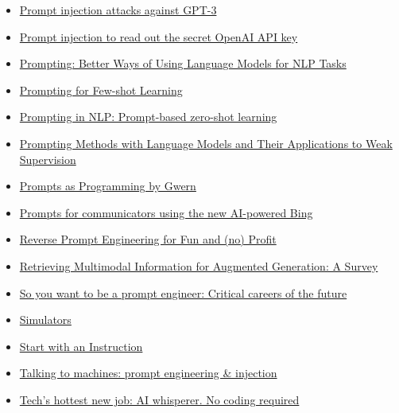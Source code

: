 \begin{itemize}
  \item \href{https://simonwillison.net/2022/Sep/12/prompt-injection}{Prompt injection attacks against GPT-3}
  \item \href{https://twitter.com/ludwig_stumpp/status/1619701277419794435?s=20&t=GtoMlmYCSt-UmvjqJVbBSA}{Prompt injection to read out the secret OpenAI API key}
  \item \href{https://thegradient.pub/prompting/}{Prompting: Better Ways of Using Language Models for NLP Tasks}
  \item \href{https://www.cs.princeton.edu/courses/archive/fall22/cos597G/lectures/lec05.pdf}{Prompting for Few-shot Learning}
  \item \href{https://savasy-22028.medium.com/prompting-in-nlp-prompt-based-zero-shot-learning-3f34bfdb2b72}{Prompting in NLP: Prompt-based zero-shot learning}
  \item \href{https://snorkel.ai/prompting-methods-with-language-models-nlp}{Prompting Methods with Language Models and Their Applications to Weak Supervision}
  \item \href{https://www.gwern.net/GPT-3#prompts-as-programming}{Prompts as Programming by Gwern}
  \item \href{https://blogs.microsoft.com/blog/2023/03/16/prompts-for-communicators-using-the-new-ai-powered-bing/}{Prompts for communicators using the new AI-powered Bing}
  \item \href{https://lspace.swyx.io/p/reverse-prompt-eng}{Reverse Prompt Engineering for Fun and (no) Profit}
  \item \href{https://arxiv.org/pdf/2303.10868.pdf}{Retrieving Multimodal Information for Augmented Generation: A Survey}
  \item \href{https://venturebeat.com/ai/so-you-want-to-be-a-prompt-engineer-critical-careers-of-the-future/}{So you want to be a prompt engineer: Critical careers of the future}
  \item \href{https://www.lesswrong.com/posts/vJFdjigzmcXMhNTsx/simulators}{Simulators}
  \item \href{https://beta.openai.com/docs/quickstart/start-with-an-instruction}{Start with an Instruction}
  \item \href{https://artifact-research.com/artificial-intelligence/talking-to-machines-prompt-engineering-injection}{Talking to machines: prompt engineering \& injection}
  \item \href{https://www.washingtonpost.com/technology/2023/02/25/prompt-engineers-techs-next-big-job/}{Tech’s hottest new job: AI whisperer. No coding required}

\end{itemize}
